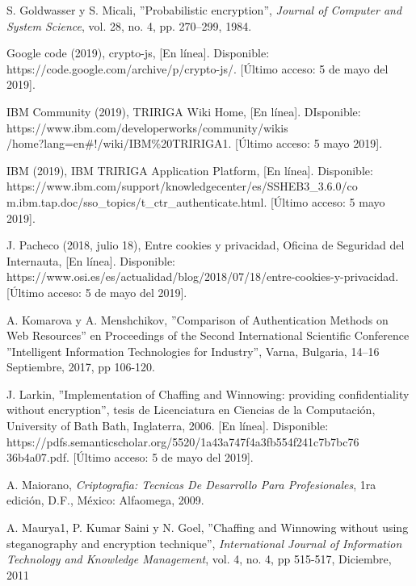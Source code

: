 \documentclass[12pt, a4paper, titlepage]{report}
\begin{document}
\begin{thebibliography}{20}
		S.  Goldwasser y S. Micali, ''Probabilistic encryption'', \textit{Journal  of Computer and System Science}, vol. 28, no. 4, pp. 270–299, 1984.
		
        Google code (2019), crypto-js, [En línea]. Disponible: https://code.google.com/archive/p/crypto-js/. [Último acceso: 5 de mayo del 2019].
		
        IBM Community (2019), TRIRIGA Wiki Home, [En línea]. DIsponible: 	https://www.ibm.com/developerworks/community/wikis\\
        /home?lang=en\#!/wiki/IBM\%20TRIRIGA1. [Último acceso: 5 mayo 2019].
        
        IBM (2019), IBM TRIRIGA Application Platform, [En línea]. Disponible: https://www.ibm.com/support/knowledgecenter/es/SSHEB3\_3.6.0/co m.ibm.tap.doc/sso\_topics/t\_ctr\_authenticate.html. [Último acceso: 5 mayo 2019].
		
		J. Pacheco (2018, julio 18), Entre cookies y privacidad,  Oficina de Seguridad del Internauta, [En línea]. Disponible: https://www.osi.es/es/actualidad/blog/2018/07/18/entre-cookies-y-privacidad. [Último acceso: 5 de mayo del 2019].
		
	    A. Komarova y A. Menshchikov, ''Comparison of Authentication Methods on Web Resources'' en Proceedings of the Second International Scientific Conference ''Intelligent Information Technologies for Industry'', Varna, Bulgaria, 14–16 Septiembre, 2017, pp 106-120.
	    
    	J. Larkin, ''Implementation of Chaffing and Winnowing: providing confidentiality without encryption'', tesis de Licenciatura en Ciencias de la Computación, University of Bath Bath, Inglaterra, 2006. [En línea]. Disponible: 
    	https://pdfs.semanticscholar.org/5520/1a43a747f4a3fb554f241c7b7bc76 36b4a07.pdf. [Último acceso: 5 de mayo del 2019].
		
        A. Maiorano, \textit{Criptografia: Tecnicas De Desarrollo Para Profesionales}, 1ra edición, D.F., México: Alfaomega, 2009.
		
    	A. Maurya1, P. Kumar Saini y N. Goel, ''Chaffing and Winnowing without using steganography and encryption technique'', \textit{International Journal of Information Technology and Knowledge Management}, vol. 4, no. 4, pp 515-517, Diciembre, 2011
		

\end{thebibliography}
\end{document}
